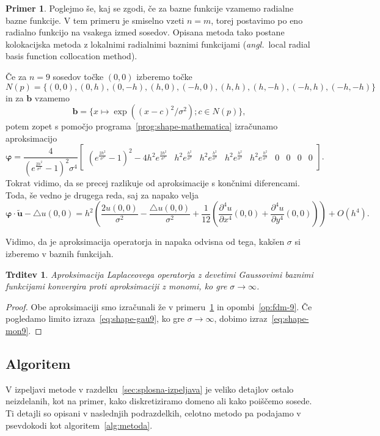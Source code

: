 \documentclass[12pt,a4paper,twoside]{article}
\theoremstyle{definition} %
\newtheorem{primer}[definicija]{Primer}
\theoremstyle{plain} %
\newtheorem{trditev}[definicija]{Trditev}
\numberwithin{equation}{section}
\newcommand{\lap}{\triangle}
\renewcommand{\b}{\boldsymbol}
\renewcommand{\phi}{\varphi}
\newcommand{\dpar}[2]{\ensuremath{\frac{\partial #1}{\partial #2}}}
\newcommand{\ang}[1]{(\textit{angl.}\ #1)}
\begin{document}
\begin{primer}
\label{prim:rbf}
Poglejmo še, kaj se zgodi, če za bazne funkcije vzamemo radialne bazne funkcije.
V tem primeru je smiselno vzeti $n = m$, torej postavimo po eno radialno funkcijo
na vsakega izmed sosedov. Opisana metoda tako postane kolokacijska metoda z
lokalnimi radialnimi baznimi funkcijami \ang{local radial basis function
collocation method}.

Če za $n = 9$ sosedov točke $(0, 0)$ izberemo točke \[ N(p) = \{
  (0, 0), (0, h), (0, -h), (h, 0), (-h, 0), (h, h), (h, -h), (-h, h), (-h, -h)
\} \] in za $\b b$ vzamemo \[ \b b = \{ x\mapsto \exp((x-c)^2/\sigma^2); c \in N(p)
\}, \]
potem zopet s
pomočjo programa~\ref{prog:shape-mathematica} izračunamo aproksimacijo
\small
\begin{equation}
  \b\phi =\frac{4}{(e^{\frac{2 h^2}{\sigma^2 }}-1)^2 \sigma^4}
\begin{bmatrix}
  (e^{\frac{2 h^2}{\sigma^2 }}-1)^2 -4h^2 e^{\frac{2 h^2}{\sigma^2 }} &
   h^2e^{\frac{h^2}{\sigma^2 }} & h^2e^{\frac{h^2}{\sigma^2 }} &
   h^2e^{\frac{h^2}{\sigma^2 }} & h^2e^{\frac{h^2}{\sigma^2 }} & 0 & 0 & 0 & 0
 \end{bmatrix}.
  \label{eq:shape-gau9}
\end{equation}
\normalsize
Tokrat vidimo, da se precej razlikuje od aproksimacije s končnimi diferencami.
Toda, še vedno je drugega reda, saj za napako velja
\[
  \b \phi\cdot \b{\tilde{u}} - \lap u(0, 0) =
  h^2\left(\frac{2u(0,0)}{\sigma^2} - \frac{\lap u(0,0)}{\sigma^2} +
  \frac{1}{12}\left( \dpar{^4u}{x^4}(0,0) + \dpar{^4u}{y^4}(0, 0) \right)\right)
  + O(h^4).
\]
\end{primer}

Vidimo, da je aproksimacija operatorja in napaka odvisna od tega, kakšen
$\sigma$ si izberemo v baznih funkcijah.
\begin{trditev}
  \label{trd:rbf-konv-k-mon}
  Aproksimacija Laplaceovega operatorja z devetimi Gaussovimi baznimi funkcijami
  konvergira proti aproksimaciji z monomi, ko gre $\sigma \to \infty$.
\end{trditev}
\begin{proof}
  Obe aproksimaciji smo izračunali že v primeru~\ref{prim:rbf} in
  opombi~\ref{op:fdm-9}. Če pogledamo limito izraza~\eqref{eq:shape-gau9},
  ko gre $\sigma \to \infty$, dobimo izraz~\eqref{eq:shape-mon9}.
\end{proof}

\subsection{Algoritem}
V izpeljavi metode v razdelku~\ref{sec:splosna-izpeljava} je veliko detajlov
ostalo neizdelanih, kot na primer, kako diskretiziramo domeno ali kako poiščemo
sosede. Ti detajli so opisani v naslednjih podrazdelkih, celotno metodo pa podajamo v
psevdokodi kot algoritem~\ref{alg:metoda}.
\end{document}
